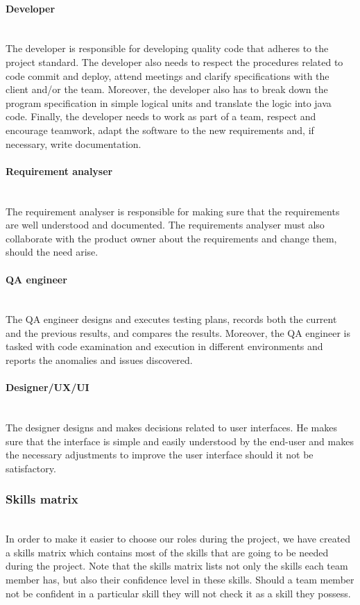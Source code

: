 \documentclass[../document.tex]{subfiles}
\begin{document}
\paragraph{Developer} \ \\
The developer is responsible for developing quality code that adheres to the project standard. The developer also needs to respect the procedures related to code commit and deploy, attend meetings and clarify specifications with the client and/or the team. Moreover, the developer also has to break down the program specification in simple logical units and translate the logic into java code. Finally, the developer needs to work as part of a team, respect and encourage teamwork, adapt the software to the new requirements and, if necessary, write documentation.

\paragraph{Requirement analyser} \ \\
The requirement analyser is responsible for making sure that the requirements are well understood and documented. The requirements analyser must also collaborate with the product owner about the requirements and change them, should the need arise.

\paragraph{QA engineer} \ \\
The QA engineer designs and executes testing plans, records both the current and the previous results, and compares the results. Moreover, the QA engineer is tasked with code examination and execution in different environments and reports the anomalies and issues discovered. 

\paragraph{Designer/UX/UI} \ \\
The designer designs and makes decisions related to user interfaces. He makes sure that the interface is simple and easily understood by the end-user and makes the necessary adjustments to improve the user interface should it not be satisfactory.

\subsubsection{Skills matrix} \ \\
In order to make it easier to choose our roles during the project, we have created a skills matrix which contains most of the skills that are going to be needed during the project. Note that the skills matrix lists not only the skills each team member has, but also their confidence level in these skills. Should a team member not be confident in a particular skill they will not check it as a skill they possess.
\end{document}
